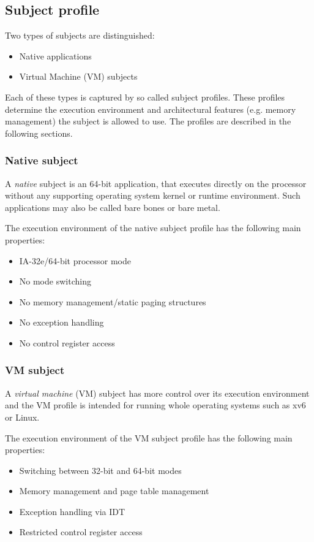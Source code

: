 \subsection{Subject profile}
Two types of subjects are distinguished:

\begin{itemize}
	\item Native applications
	\item Virtual Machine (VM) subjects
\end{itemize}

Each of these types is captured by so called subject profiles. These profiles
determine the execution environment and architectural features (e.g. memory
management) the subject is allowed to use. The profiles are described in the
following sections.

\subsubsection{Native subject}
A \emph{native} subject is an 64-bit application, that executes directly on the
processor without any supporting operating system kernel or runtime environment.
Such applications may also be called bare bones or bare metal.

The execution environment of the native subject profile has the following main
properties:

\begin{itemize}
	\item IA-32e/64-bit processor mode
	\item No mode switching
	\item No memory management/static paging structures
	\item No exception handling
	\item No control register access
\end{itemize}

\subsubsection{VM subject}
A \emph{virtual machine} (VM) subject has more control over its execution
environment and the VM profile is intended for running whole operating systems
such as xv6 or Linux.

The execution environment of the VM subject profile has the following main
properties:

\begin{itemize}
	\item Switching between 32-bit and 64-bit modes
	\item Memory management and page table management
	\item Exception handling via IDT
	\item Restricted control register access
\end{itemize}

